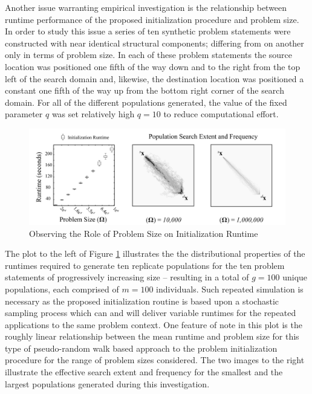 Another issue warranting empirical investigation is the relationship between runtime performance of the proposed initialization procedure and problem size. In order to study this issue a series of ten synthetic problem statements were constructed with near identical structural components; differing from on another only in terms of problem size. In each of these problem statements the source location was positioned one fifth of the way down and to the right from the top left of the search domain and, likewise, the destination location was positioned a constant one fifth of the way up from the bottom right corner of the search domain. For all of the different populations generated, the value of the fixed parameter $q$ was set relatively high $q = 10$ to reduce computational effort.
            
            \begin{figure}[Observing the Role of Problem Size on Initialization Runtime]
            \centering
            \includegraphics[width=5.5in]{figures/problem-size-study.png}
            \caption[Observing the Role of Problem Size on Initialization Runtime]{Observing the Role of Problem Size on Initialization Runtime}
            \label{fig:problem-size}
            \end{figure}
            
The plot to the left of Figure \ref{fig:problem-size} illustrates the the distributional properties of the runtimes required to generate ten replicate populations for the ten problem statements of progressively increasing size – resulting in a total of $g = 100$ unique populations, each comprised of $m = 100$ individuals. Such repeated simulation is necessary as the proposed initialization routine is based upon a stochastic sampling process which can and will deliver variable runtimes for the repeated applications to the same problem context. One feature of note in this plot is the roughly linear relationship between the mean runtime and problem size for this type of pseudo-random walk based approach to the problem initialization procedure for the range of problem sizes considered. The two images to the right illustrate the effective search extent and frequency for the smallest and the largest populations generated during this investigation.
            
